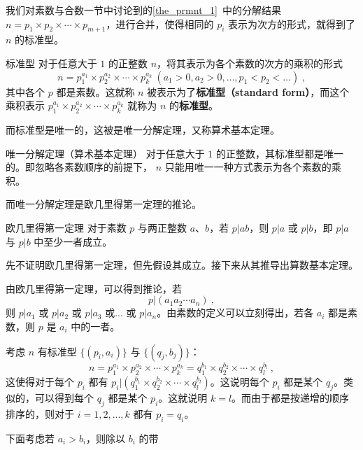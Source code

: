 
我们对素数与合数一节中讨论到的\autoref{the_prmnt_1}~中的分解结果 $n = p_1 \times p_2\times \cdots \times p_{m+1}$，进行合并，使得相同的 $p_i$ 表示为次方的形式，就得到了 $n$ 的标准型。
\begin{definition}{标准型}
对于任意大于 $1$ 的正整数 $n$，将其表示为各个素数的次方的乘积的形式
\begin{equation}
n = p_1^{a_1} \times p_2^{a_2} \times \cdots \times p_k^{a_k} ~ (a_1 > 0, a_2 > 0 , \dots, p_1 < p_2<\dots) ~,
\end{equation}
其中各个 $p$ 都是素数。这就称 $n$ 被表示为了\textbf{标准型（standard form）}，而这个乘积表示 $p_1^{a_1} \times p_2^{a_2} \times \cdots \times p_k^{a_k}$ 就称为 $n$ 的\textbf{标准型}。
\end{definition}

而标准型是唯一的，这被是唯一分解定理，又称算术基本定理。
\begin{theorem}{唯一分解定理（算术基本定理）}
对于任意大于 $1$ 的正整数，其标准型都是唯一的。即忽略各素数顺序的前提下， $n$ 只能用唯一一种方式表示为各个素数的乘积。
\end{theorem}

而唯一分解定理是欧几里得第一定理的推论。
\begin{theorem}{欧几里得第一定理}
对于素数 $p$ 与两正整数 $a$、$b$，若 $p|ab$，则 $p|a$ 或 $p|b$，即 $p|a$ 与 $p|b$ 中至少一者成立。
\end{theorem}

先不证明欧几里得第一定理，但先假设其成立。接下来从其推导出算数基本定理。

由欧几里得第一定理，可以得到推论，若
\begin{equation}
p | (a_1 a_2 \cdots a_n) ~,
\end{equation}
则 $p | a_1$ 或 $p | a_2$ 或 $p|a_3$ 或... 或 $p|a_n$。由素数的定义可以立刻得出，若各 $a_i$ 都是素数，则 $p$ 是 $a_i$ 中的一者。

考虑 $n$ 有标准型 $\{(p_i, a_i)\}$ 与  $\{(q_j, b_j)\}$：
\begin{equation}
n = p_1^{a_1}\times p_2^{a_2} \times \cdots \times p_k^{a_k} = q_1^{b_1} \times q_2^{b_2} \times \cdots \times q_l^{b_l} ~,
\end{equation}
这使得对于每个 $p_i$ 都有 $p_i | (q_1^{b_1} \times q_2^{b_2} \times \cdots \times q_l^{b_l})$。这说明每个 $p_i$ 都是某个 $q_j$。类似的，可以得到每个 $q_j$ 都是某个 $p_i$。这就说明 $k = l$。而由于都是按递增的顺序排序的，则对于 $i = 1,2,\dots, k$ 都有 $p_i = q_i$。

下面考虑若 $a_i > b_i$，则除以 $b_i$ 的带